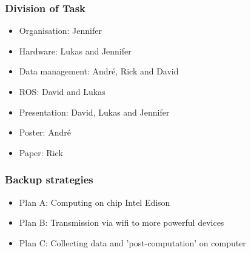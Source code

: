 \documentclass{beamer}
\begin{document}
\begin{frame}
\frametitle{Division of Task}
\begin{itemize}
\item Organisation: Jennifer
\item Hardware: Lukas and Jennifer
\item Data management: Andr\'e, Rick and David
\item ROS: David and Lukas
\item Presentation: David, Lukas and Jennifer
\item Poster: Andr\'e
\item Paper: Rick
\end{itemize}
\end{frame}

\begin{frame}
\frametitle{Backup strategies}
\begin{itemize}
\item Plan A: Computing on chip Intel Edison
\item Plan B: Transmission via wifi to more powerful devices 
\item Plan C: Collecting data and 'post-computation' on computer
\end{itemize}
\end{frame}
\end{document}
